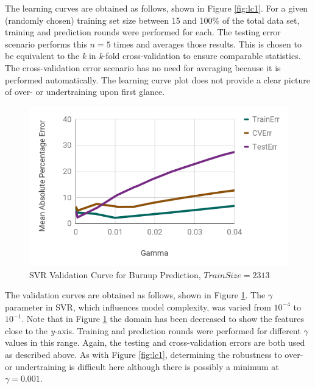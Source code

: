 The learning curves are obtained as follows, shown in Figure \ref{fig:lc1}.
For a given (randomly chosen) training set size between 15 and 100\% of the
total data set, training and prediction rounds were performed for each. The
testing error scenario performs this $n=5$ times and averages those results.
This is chosen to be equivalent to the \textit{k} in \textit{k}-fold
cross-validation to ensure comparable statistics.  The cross-validation error
scenario has no need for averaging because it is performed automatically. The
learning curve plot does not provide a clear picture of over- or undertraining
upon first glance. 

\begin{figure}[!htb]
    \centering
    \includegraphics[width=\linewidth]{./chapters/demo_method/vc1.png}
    \caption{\acrshort{SVR} Validation Curve for Burnup Prediction, $TrainSize = 2313$}
    \label{fig:vc1}
\end{figure}

The validation curves are obtained as follows, shown in Figure \ref{fig:vc1}.
The $\gamma$ parameter in \gls{SVR}, which influences model complexity, was
varied from $10^{-4}$ to $10^{-1}$. Note that in Figure \ref{fig:vc1} the
domain has been decreased to show the features close to the \textit{y}-axis.
Training and prediction rounds were performed for different $\gamma$ values in
this range.  Again, the testing and cross-validation errors are both used as
described above. As with Figure \ref{fig:lc1}, determining the robustness to
over- or undertraining is difficult here although there is possibly a minimum
at $\gamma = 0.001$.   


